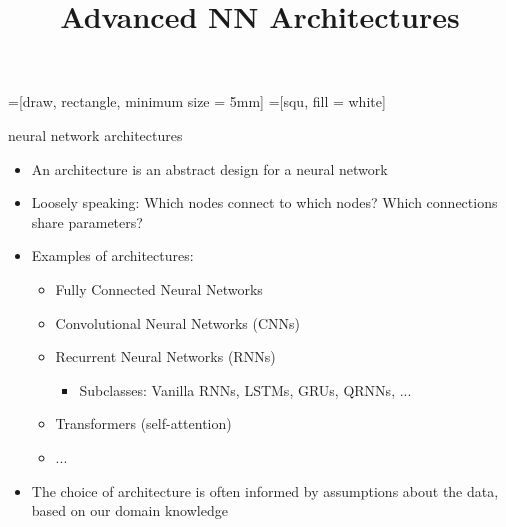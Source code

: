 



=[draw, rectangle, minimum size = 5mm]
=[squ, fill = white]

\newcommand{\learninggoals}{
\item Understand the convolution operation and layer
\item Understand applicatoin of CNNs in image analysis
\item Understand applicatoin of CNNs in NLP}

\title{Advanced NN Architectures}
\date{}




\begin{vbframe}{neural network architectures}

\vfill

\begin{itemize}
	\item An architecture is an abstract design for a neural network
	\item Loosely speaking: Which nodes connect to which nodes? Which connections share parameters?
	\item Examples of architectures:
		\begin{itemize}
			\item Fully Connected Neural Networks
			\item Convolutional Neural Networks (CNNs)
			\item Recurrent Neural Networks (RNNs)
			\begin{itemize}
				\item Subclasses: Vanilla RNNs, LSTMs, GRUs, QRNNs, ...
			\end{itemize}
			\item Transformers (self-attention)
			\item ...
		\end{itemize}
	\item The choice of architecture is often informed by assumptions about the data, based on our domain knowledge
\end{itemize}

\vfill

\end{vbframe}

